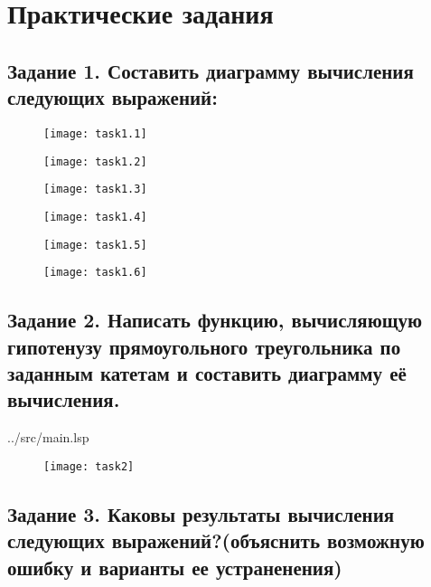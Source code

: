 \chapter{Практические задания}

\section*{Задание 1. Составить диаграмму вычисления следующих выражений:}

\begin{figure}[h!]
	\texttt{[image: task1.1]}
\end{figure}

\begin{figure}[h!]
	\texttt{[image: task1.2]}
\end{figure}

\begin{figure}[h!]
	\texttt{[image: task1.3]}
\end{figure}

\begin{figure}[h!]
	\texttt{[image: task1.4]}
\end{figure}

\begin{figure}[h!]
	\texttt{[image: task1.5]}
\end{figure}

\begin{figure}[h!]
	\texttt{[image: task1.6]}
\end{figure}
\clearpage

\section*{Задание 2. Написать функцию, вычисляющую гипотенузу прямоугольного треугольника по заданным катетам и составить диаграмму её вычисления.}

\begin{lstinputlisting}[
	caption={Задание 2},
	label={lst:t2},
	style={lsp},
	linerange={3-4},
	]{../src/main.lsp}
\end{lstinputlisting}

\begin{figure}[h!]
	\texttt{[image: task2]}
\end{figure}

\section*{Задание 3. Каковы результаты вычисления следующих выражений?(объяснить возможную ошибку и варианты ее устраненения)}

